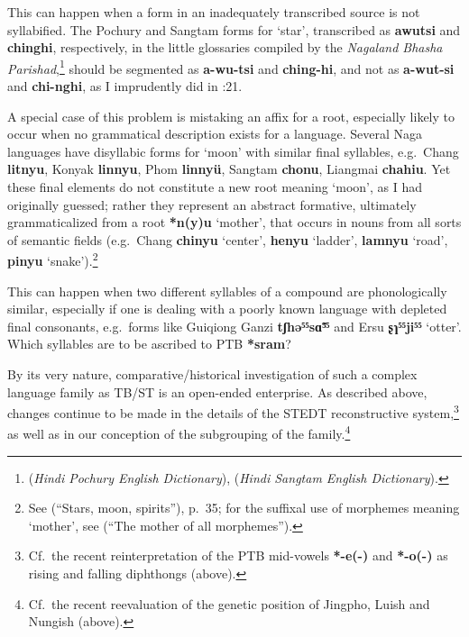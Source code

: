 \begin{description}[leftmargin=20pt, labelindent=20pt]
\item[Wrong segmentation]
This can happen when a form in an inadequately transcribed source is not
syllabified. The Pochury and Sangtam forms for ‘star’, transcribed as \textbf{awutsi}
and \textbf{chinghi}, respectively, in the little glossaries compiled by the
\textit{Nagaland
Bhasha Parishad},\footnote{\citealt{BBK-Pochury} (\textit{Hindi Pochury English Dictionary}),
\citeyear{BBK-Sangtam} (\textit{Hindi
Sangtam English Dictionary}).}
 should be segmented as \textbf{a-wu-tsi} and \textbf{ching-hi},
and not as \textbf{a-wut-si} and \textbf{chi-nghi}, as I
imprudently did in \citealt{JAM-SMS}:21.

\item[Misunderstanding the meaning of a constituent]
A special case of this problem is mistaking an affix for a root, especially
likely to occur when no grammatical description exists for a language. Several
Naga languages have disyllabic forms for ‘moon’ with similar final syllables,
e.g.\ Chang \textbf{litnyu}, Konyak \textbf{linnyu},
Phom \textbf{linnyü}, Sangtam \textbf{chonu}, Liangmai \textbf{chahiu}.
Yet these final elements do not constitute a new root meaning ‘moon’, as I had
originally guessed; rather they represent an abstract formative, ultimately
grammaticalized from a root \textbf{*n(y)u} ‘mother’, that occurs in nouns from all sorts
of semantic fields (e.g.\ Chang \textbf{chinyu} ‘center’,
\textbf{henyu} ‘ladder’, \textbf{lamnyu} ‘road’,
\textbf{pinyu} ‘snake’).\footnote{See \citealt{JAM-SMS} (“Stars, moon, spirits”), p.\ 35;
for the suffixal use of morphemes meaning ‘mother’, see \citealt{JAM-MOAM} (“The mother of all
morphemes”).}


\item[Choosing the wrong syllable of a compound for an etymology]
This can happen when two different syllables of a compound are phonologically
similar, especially if one is dealing with a poorly known language with depleted
final consonants, e.g.\ forms like Guiqiong Ganzi \textbf{tʃhə⁵⁵sɑ̃⁵⁵}
and Ersu \textbf{ʂɿ⁵⁵ji⁵⁵} ‘otter’.
Which syllables are to be ascribed to PTB \textbf{*sram}?

\end{description}

By its very nature, comparative/historical investigation of such a complex language family as TB/ST is an open-ended enterprise. As described above, changes continue to be made in the details of the STEDT reconstructive system,\footnote{Cf.\ the recent reinterpretation of the PTB mid-vowels \textbf{*-e(-)} and \textbf{*-o(-)} as rising and falling diphthongs (above).} as well as in our conception of the subgrouping of the family.\footnote{Cf.\ the recent reevaluation of the genetic position of Jingpho, Luish and Nungish (above).}

